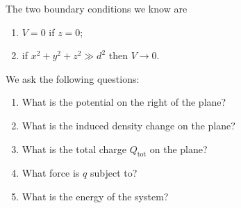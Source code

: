 \documentclass[12pt]{extarticle}
\begin{document}
The two boundary conditions we know are
\begin{enumerate}
	\item $V = 0$ if $z = 0$;
	\item if $x^2 + y^2 + z^2 \gg d^2$ then $V \to 0$.
\end{enumerate}

We ask the following questions:
\begin{enumerate}[label=\alph*)]
	\item What is the potential on the right of the plane?
	\item What is the induced density change on the plane?
	\item What is the total charge $Q_\text{tot}$ on the plane?
	\item What force is $q$ subject to?
	\item What is the energy of the system?
\end{enumerate}
\end{document}
